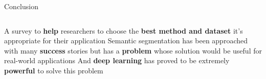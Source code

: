 \begin{frame}[t]{Conclusion} 
    \begin{columns}[c]
            \newline
            \newline
                A survey to \textbf{help} researchers to choose the \textbf{best method and dataset} it's appropriate for their application
            \newline
            \newline
                Semantic segmentation has been approached with many \textbf{success} stories but has a \textbf{problem} whose solution would be useful for real-world applications
            \newline
            \newline
                And \textbf{deep learning} has proved to be extremely \textbf{powerful} to solve this problem
           
        
    \end{columns}
    
\end{frame}

